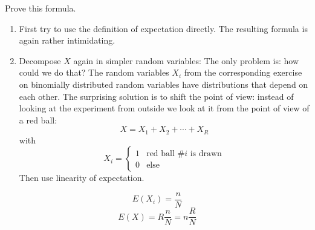 \documentclass[twoside,11pt,a4paper]{article}
\newif\ifEN \ENtrue	                %
\def\tr|#1|#2|{\ifEN #2\else #1\fi}     %
\theoremstyle{definition}
\newcounter{exc}
\def\answerline#1{%
   \ifhmode\\[1ex]\fcolorbox{solbox}{solbox}{\hbox to \linewidth{\vbox to #1\baselineskip{}}}%
   \else\fcolorbox{solbox}{solbox}{\hbox to \linewidth{\vbox to #1\baselineskip{}}}%
   \fi
 }
\begin{document}
\begin{xxwrap}
  \begin{exc}
    \tr|Beweisen Sie obige Formel.| Prove this formula.|
    \begin{enumerate}
    \item \tr|Versuchen Sie zuerst direkt die Definition des Erwartungswertes anzuwenden.
              Dabei entsteht wieder eine einschüchternde Formel.
             |First try to use the definition of expectation directly.
              The resulting formula is again rather intimidating. |
    \item \tr|Zerlegen Sie $X$ wieder in einfachere Zufallsvariabeln:
              Das Problem ist nur wie? Die Zufallsvariabeln $X_i$ aus der entsprechenden Aufgabe für die Binomialverteilung haben Verteilungen die voneinander abhängen.
              Der überraschende Ausweg besteht darin den Standpunkt zu wechseln: Statt das Experiment aus der Sicht der 'Ziehenden' zu betrachten, schauen wir es aus der Sicht einer roten Kugel an: 
             |Decompose $X$ again in simpler random variables: The only problem is: how could we do that? The random variables $X_i$ from the corresponding exercise on binomially distributed 
              random variables have distributions that depend on each other. The surprising solution is to shift the point of view: instead of looking at the experiment from outside we look at it 
              from the point of view of a red ball:|
          \[
            X=X_1+X_2+\cdots+X_R
          \]
          \tr|mit|with|
          \[
            X_i=
            \begin{cases}
              1 & \text{\tr|Die rote Kugel \#$i$ wird gezogen|red ball \#$i$ is drawn|}\\
              0 & \text{\tr|sonst|else|}
            \end{cases}
          \]
          \tr|Verwenden Sie dann die Linearität des Erwartungswertes.|Then use linearity of expectation.|
    \end{enumerate}
  \end{exc}
  \begin{Answer}
   \[
   E(X_i)=\frac nN
   \]
   \[
   E(X)=R\frac nN=n\frac RN
   \] 
  \end{Answer}
  \answerline{12}
\end{xxwrap}
\end{document}
